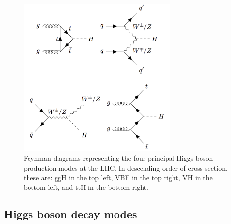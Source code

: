 
\begin{figure}[hptb]
\centering
\includegraphics[width=0.7\textwidth]{Figures/Theory/FeynProd.png}
\caption{
  Feynman diagrams representing the four principal Higgs boson production modes at the LHC.
  In descending order of cross section, these are: ggH in the top left, VBF in the top right, 
  VH in the bottom left, and ttH in the bottom right.
}
\label{fig:theory_FeynProd}
\end{figure}

\subsection{Higgs boson decay modes}

